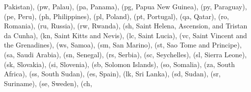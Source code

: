 \documentclass[letterpaper,10pt,english]{sphinxmanual}
\begin{document}
\begin{fulllineitems}
\begin{fulllineitems}
\textquotesingle{}Pakistan\textquotesingle{}), (\textquotesingle{}pw\textquotesingle{}, \textquotesingle{}Palau\textquotesingle{}), (\textquotesingle{}pa\textquotesingle{}, \textquotesingle{}Panama\textquotesingle{}), (\textquotesingle{}pg\textquotesingle{}, \textquotesingle{}Papua New Guinea\textquotesingle{}), (\textquotesingle{}py\textquotesingle{}, \textquotesingle{}Paraguay\textquotesingle{}), (\textquotesingle{}pe\textquotesingle{}, \textquotesingle{}Peru\textquotesingle{}), (\textquotesingle{}ph\textquotesingle{}, \textquotesingle{}Philippines\textquotesingle{}), (\textquotesingle{}pl\textquotesingle{}, \textquotesingle{}Poland\textquotesingle{}), (\textquotesingle{}pt\textquotesingle{}, \textquotesingle{}Portugal\textquotesingle{}), (\textquotesingle{}qa\textquotesingle{}, \textquotesingle{}Qatar\textquotesingle{}), (\textquotesingle{}ro\textquotesingle{}, \textquotesingle{}Romania\textquotesingle{}), (\textquotesingle{}ru\textquotesingle{}, \textquotesingle{}Russia\textquotesingle{}), (\textquotesingle{}rw\textquotesingle{}, \textquotesingle{}Rwanda\textquotesingle{}), (\textquotesingle{}sh\textquotesingle{}, \textquotesingle{}Saint Helena, Ascension, and Tristan da Cunha\textquotesingle{}), (\textquotesingle{}kn\textquotesingle{}, \textquotesingle{}Saint Kitts and Nevis\textquotesingle{}), (\textquotesingle{}lc\textquotesingle{}, \textquotesingle{}Saint Lucia\textquotesingle{}), (\textquotesingle{}vc\textquotesingle{}, \textquotesingle{}Saint Vincent and the Grenadines\textquotesingle{}), (\textquotesingle{}ws\textquotesingle{}, \textquotesingle{}Samoa\textquotesingle{}), (\textquotesingle{}sm\textquotesingle{}, \textquotesingle{}San Marino\textquotesingle{}), (\textquotesingle{}st\textquotesingle{}, \textquotesingle{}Sao Tome and Principe\textquotesingle{}), (\textquotesingle{}sa\textquotesingle{}, \textquotesingle{}Saudi Arabia\textquotesingle{}), (\textquotesingle{}sn\textquotesingle{}, \textquotesingle{}Senegal\textquotesingle{}), (\textquotesingle{}rs\textquotesingle{}, \textquotesingle{}Serbia\textquotesingle{}), (\textquotesingle{}sc\textquotesingle{}, \textquotesingle{}Seychelles\textquotesingle{}), (\textquotesingle{}sl\textquotesingle{}, \textquotesingle{}Sierra Leone\textquotesingle{}), (\textquotesingle{}sk\textquotesingle{}, \textquotesingle{}Slovakia\textquotesingle{}), (\textquotesingle{}si\textquotesingle{}, \textquotesingle{}Slovenia\textquotesingle{}), (\textquotesingle{}sb\textquotesingle{}, \textquotesingle{}Solomon Islands\textquotesingle{}), (\textquotesingle{}so\textquotesingle{}, \textquotesingle{}Somalia\textquotesingle{}), (\textquotesingle{}za\textquotesingle{}, \textquotesingle{}South Africa\textquotesingle{}), (\textquotesingle{}ss\textquotesingle{}, \textquotesingle{}South Sudan\textquotesingle{}), (\textquotesingle{}es\textquotesingle{}, \textquotesingle{}Spain\textquotesingle{}), (\textquotesingle{}lk\textquotesingle{}, \textquotesingle{}Sri Lanka\textquotesingle{}), (\textquotesingle{}sd\textquotesingle{}, \textquotesingle{}Sudan\textquotesingle{}), (\textquotesingle{}sr\textquotesingle{}, \textquotesingle{}Suriname\textquotesingle{}), (\textquotesingle{}se\textquotesingle{}, \textquotesingle{}Sweden\textquotesingle{}), (\textquotesingle{}ch\textquotesingle{}, 
\end{fulllineitems}
\end{fulllineitems}
\end{document}
